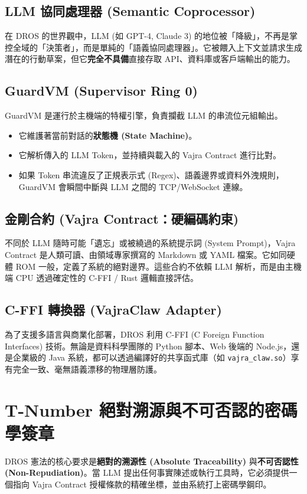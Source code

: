 \documentclass[conference]{IEEEtran}
\begin{document}
\subsection{LLM 協同處理器 (Semantic Coprocessor)}
在 DROS 的世界觀中，LLM (如 GPT-4, Claude 3) 的地位被「降級」，不再是掌控全域的「決策者」，而是單純的「語義協同處理器」。它被餵入上下文並請求生成潛在的行動草案，但它\textbf{完全不具備}直接存取 API、資料庫或客戶端輸出的能力。

\subsection{GuardVM (Supervisor Ring 0)}
GuardVM 是運行於主機端的特權引擎，負責攔截 LLM 的串流位元組輸出。
\begin{itemize}
    \item 它維護著當前對話的\textbf{狀態機 (State Machine)}。
    \item 它解析傳入的 LLM Token，並持續與載入的 Vajra Contract 進行比對。
    \item 如果 Token 串流違反了正規表示式 (Regex)、語義邊界或資料外洩規則，GuardVM 會瞬間中斷與 LLM 之間的 TCP/WebSocket 連線。
\end{itemize}

\subsection{金剛合約 (Vajra Contract：硬編碼約束)}
不同於 LLM 隨時可能「遺忘」或被繞過的系統提示詞 (System Prompt)，Vajra Contract 是人類可讀、由領域專家撰寫的 Markdown 或 YAML 檔案。它如同硬體 ROM 一般，定義了系統的絕對邊界。這些合約不依賴 LLM 解析，而是由主機端 CPU 透過確定性的 C-FFI / Rust 邏輯直接評估。

\subsection{C-FFI 轉換器 (VajraClaw Adapter)}
為了支援多語言與商業化部署，DROS 利用 C-FFI (C Foreign Function Interfaces) 技術。無論是資料科學團隊的 Python 腳本、Web 後端的 Node.js，還是企業級的 Java 系統，都可以透過編譯好的共享函式庫（如 \texttt{vajra\_claw.so}）享有完全一致、毫無語義漂移的物理層防護。

\section{T-Number 絕對溯源與不可否認的密碼學簽章}
DROS 憲法的核心要求是\textbf{絕對的溯源性 (Absolute Traceability)} 與\textbf{不可否認性 (Non-Repudiation)}。當 LLM 提出任何事實陳述或執行工具時，它必須提供一個指向 Vajra Contract 授權條款的精確坐標，並由系統打上密碼學鋼印。
\end{document}
